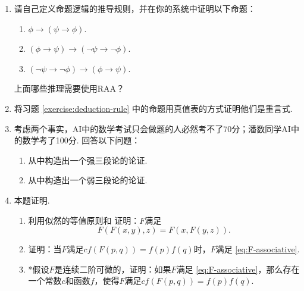 \begin{enumerate}[wide, labelindent=0pt]
    \item \label{exercise:deduction-rule} 请自己定义命题逻辑的推导规则，并在你的系统中证明以下命题：
    \begin{enumerate}
        \item $\phi\to(\psi\to\phi)$.
        \item $(\phi\to\psi)\to(\neg\psi\to\neg\phi)$.
        \item $(\neg\psi\to\neg\phi)\to(\phi\to\psi)$.
    \end{enumerate}
    上面哪些推理需要使用RAA？

    \item 将习题 \ref{exercise:deduction-rule} 中的命题用真值表的方式证明他们是重言式.
    
    \item 考虑两个事实，AI中的数学考试只会做题的人必然考不了70分；潘数同学AI中的数学考了100分. 回答以下问题：
    \begin{enumerate}
        \item 从中构造出一个强三段论的论证.
        \item 从中构造出一个弱三段论的论证. 
    \end{enumerate}
    
    \item \label{exercise:derive-F} \cite{coxProbabilityFrequencyReasonable1946} 本题证明. 
    \begin{enumerate}
        \item 利用似然的等值原则和 证明：$F$满足
        \begin{equation}
            F(F(x,y),z)=F(x,F(y,z)). \label{eq:F-associative}
        \end{equation}
        \item 证明：当$F$满足$cf(F(p,q))=f(p)f(q)$时，$F$满足 \eqref{eq:F-associative}.
        \item *假设$F$是连续二阶可微的，证明：如果$F$满足 \eqref{eq:F-associative}，那么存在一个常数$c$和函数$f$，使得$F$满足$cf(F(p,q))=f(p)f(q)$.
    \end{enumerate}
    

\end{enumerate}
